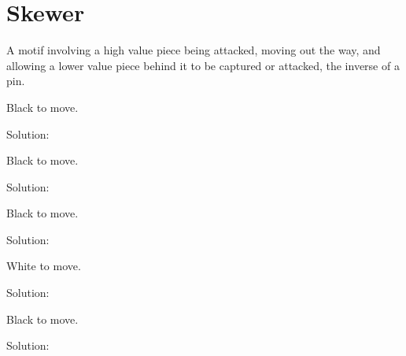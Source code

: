 \documentclass{book}
\begin{document}
\section{Skewer}
A motif involving a high value piece being attacked, moving out the way, and allowing a lower value piece behind it to be captured or attacked, the inverse of a pin.\begin{multicols}{2} 
\begin{samepage} 
\newgame 


 
\showboard
 
 Black to move. 
 
Solution: 
 
\end{samepage}\begin{samepage} 
\newgame 


 
\showboard
 
 Black to move. 
 
Solution: 
 
\end{samepage}\begin{samepage} 
\newgame 


 
\showboard
 
 Black to move. 
 
Solution: 
 
\end{samepage}\begin{samepage} 
\newgame 


 
\showboard
 
 White to move. 
 
Solution: 
 
\end{samepage}\begin{samepage} 
\newgame 


 
\showboard
 
 Black to move. 
 
Solution: 
 
\end{samepage}\end{multicols} 
\newpage 
\end{document}
